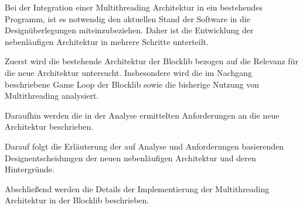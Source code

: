 Bei der Integration einer Multithreading Architektur in ein bestehendes Programm, ist es notwendig den aktuellen Stand der Software in die Designüberlegungen miteinzubeziehen. Daher ist die Entwicklung der nebenläufigen Architektur in mehrere Schritte unterteilt.

Zuerst wird die bestehende Architektur der Blocklib bezogen auf die Relevanz für die neue Architektur untersucht. Insbesondere wird die im Nachgang beschriebene Game Loop der Blocklib sowie die bisherige Nutzung von Multithreading analysiert.

Daraufhin werden die in der Analyse ermittelten Anforderungen an die neue Architektur beschrieben.

Darauf folgt die Erläuterung der auf Analyse und Anforderungen basierenden Designentscheidungen der neuen nebenläufigen Architektur und deren Hintergründe.

Abschließend werden die Details der Implementierung der Multithreading Architektur in der Blocklib beschrieben.